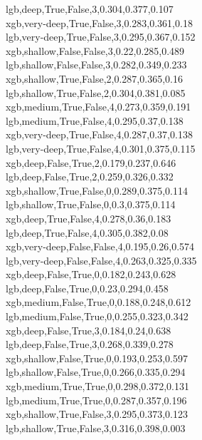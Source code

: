 lgb,deep,True,False,3,0.304,0.377,0.107 \\
xgb,very-deep,True,False,3,0.283,0.361,0.18 \\
lgb,very-deep,True,False,3,0.295,0.367,0.152 \\
xgb,shallow,False,False,3,0.22,0.285,0.489 \\
lgb,shallow,False,False,3,0.282,0.349,0.233 \\
xgb,shallow,True,False,2,0.287,0.365,0.16 \\
lgb,shallow,True,False,2,0.304,0.381,0.085 \\
xgb,medium,True,False,4,0.273,0.359,0.191 \\
lgb,medium,True,False,4,0.295,0.37,0.138 \\
xgb,very-deep,True,False,4,0.287,0.37,0.138 \\
lgb,very-deep,True,False,4,0.301,0.375,0.115 \\
xgb,deep,False,True,2,0.179,0.237,0.646 \\
lgb,deep,False,True,2,0.259,0.326,0.332 \\
xgb,shallow,True,False,0,0.289,0.375,0.114 \\
lgb,shallow,True,False,0,0.3,0.375,0.114 \\
xgb,deep,True,False,4,0.278,0.36,0.183 \\
lgb,deep,True,False,4,0.305,0.382,0.08 \\
xgb,very-deep,False,False,4,0.195,0.26,0.574 \\
lgb,very-deep,False,False,4,0.263,0.325,0.335 \\
xgb,deep,False,True,0,0.182,0.243,0.628 \\
lgb,deep,False,True,0,0.23,0.294,0.458 \\
xgb,medium,False,True,0,0.188,0.248,0.612 \\
lgb,medium,False,True,0,0.255,0.323,0.342 \\
xgb,deep,False,True,3,0.184,0.24,0.638 \\
lgb,deep,False,True,3,0.268,0.339,0.278 \\
xgb,shallow,False,True,0,0.193,0.253,0.597 \\
lgb,shallow,False,True,0,0.266,0.335,0.294 \\
xgb,medium,True,True,0,0.298,0.372,0.131 \\
lgb,medium,True,True,0,0.287,0.357,0.196 \\
xgb,shallow,True,False,3,0.295,0.373,0.123 \\
lgb,shallow,True,False,3,0.316,0.398,0.003 \\
